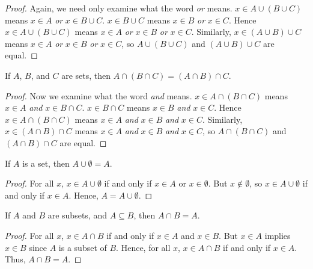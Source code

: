             \begin{proof}
                Again, we need only examine what the word \textit{or} means.
                $x\in{A}\cup(B\cup{C})$ means $x\in{A}$ \textit{or}
                $x\in{B}\cup{C}$. $x\in{B}\cup{C}$ means $x\in{B}$ \textit{or}
                $x\in{C}$. Hence $x\in{A}\cup(B\cup{C})$ means
                $x\in{A}$ \textit{or} $x\in{B}$ \textit{or} $x\in{C}$.
                Similarly, $x\in(A\cup{B})\cup{C}$ means
                $x\in{A}$ \textit{or} $x\in{B}$ \textit{or} $x\in{C}$, so
                $A\cup(B\cup{C})$ and $(A\cup{B})\cup{C}$ are equal.
            \end{proof}
            \begin{theorem}
                If $A$, $B$, and $C$ are sets, then
                $A\cap(B\cap{C})=(A\cap{B})\cap{C}$.
            \end{theorem}
            \begin{proof}
                Now we examine what the word \textit{and} means.
                $x\in{A}\cap(B\cap{C})$ means $x\in{A}$ \textit{and}
                $x\in{B}\cap{C}$. $x\in{B}\cap{C}$ means $x\in{B}$ \textit{and}
                $x\in{C}$. Hence $x\in{A}\cap(B\cap{C})$ means
                $x\in{A}$ \textit{and} $x\in{B}$ \textit{and} $x\in{C}$.
                Similarly, $x\in(A\cap{B})\cap{C}$ means
                $x\in{A}$ \textit{and} $x\in{B}$ \textit{and} $x\in{C}$, so
                $A\cap(B\cap{C})$ and $(A\cap{B})\cap{C}$ are equal.
            \end{proof}
            \begin{theorem}
                If $A$ is a set, then $A\cup\emptyset=A$.
            \end{theorem}
            \begin{proof}
                For all $x$, $x\in{A}\cup\emptyset$ if and only if
                $x\in{A}$ or $x\in\emptyset$. But $x\notin\emptyset$, so
                $x\in{A}\cup\emptyset$ if and only if $x\in{A}$. Hence,
                $A=A\cup\emptyset$.
            \end{proof}
            \begin{theorem}
                If $A$ and $B$ are subsets, and $A\subseteq{B}$, then
                $A\cap{B}=A$.
            \end{theorem}
            \begin{proof}
                For all $x$, $x\in{A}\cap{B}$ if and only if $x\in{A}$ and
                $x\in{B}$. But $x\in{A}$ implies $x\in{B}$ since $A$ is a subset
                of $B$. Hence, for all $x$, $x\in{A}\cap{B}$ if and only if
                $x\in{A}$. Thus, $A\cap{B}=A$.
            \end{proof}
